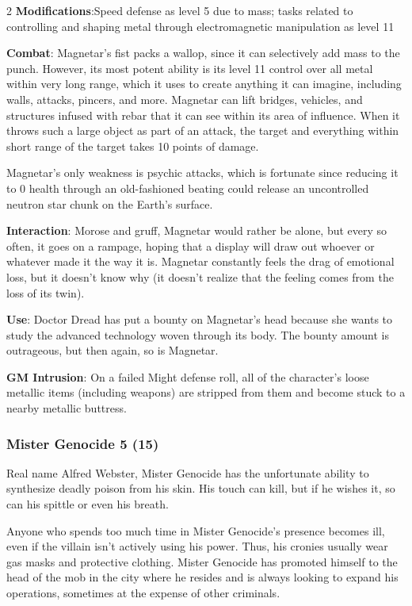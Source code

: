 \begin{multicols}{2}
\textbf{Modifications}:Speed defense as level 5 due to mass; tasks related to controlling and shaping metal through electromagnetic manipulation as level 11

\textbf{Combat}: Magnetar’s fist packs a wallop, since it can selectively add mass to the punch. However, its most potent ability is its level 11 control over all metal within very long range, which it uses to create anything it can imagine, including walls, attacks, pincers, and more. Magnetar can lift bridges, vehicles, and structures infused with rebar that it can see within its area of influence. When it throws such a large object as part of an attack, the target and everything within short range of the target takes 10 points of damage.

Magnetar’s only weakness is psychic attacks, which is fortunate since reducing it to 0 health through an
old-fashioned beating could release an uncontrolled neutron star chunk on the Earth’s surface.

\textbf{Interaction}: Morose and gruff, Magnetar would rather be alone, but every so often, it goes on a rampage, hoping that a display will draw out whoever or whatever made it the way it is. Magnetar constantly feels the drag of emotional loss, but it doesn’t know why (it doesn’t realize that the feeling comes from the loss of its twin).

\textbf{Use}: Doctor Dread has put a bounty on Magnetar’s head because she wants to study the advanced technology woven through its body. The bounty amount is outrageous, but then again, so is Magnetar.

\textbf{GM Intrusion}: On a failed Might defense roll, all of the character’s loose metallic items (including weapons) are stripped from them and become stuck to a nearby metallic buttress.

\subsubsection{Mister Genocide	5 (15)}

Real name Alfred Webster, Mister Genocide has the unfortunate ability to synthesize deadly poison from his skin. His touch can kill, but if he wishes it, so can his spittle or even his breath.

Anyone who spends too much time in Mister Genocide’s presence becomes ill, even if the villain isn’t actively using his power. Thus, his cronies usually wear gas masks and protective clothing. Mister Genocide has promoted himself to the head of the mob in the city where he resides and is always looking to expand his operations, sometimes at the expense of other criminals.


\end{multicols}
